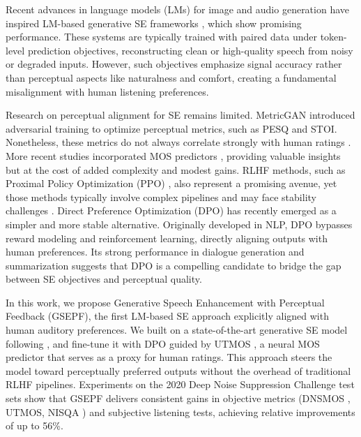 \documentclass{article}
\begin{document}
Recent advances in language models (LMs) for image and audio generation \cite{chang2023muse, wang2023neural} have inspired LM-based generative SE frameworks \cite{wang2024selm, yang2024genhancer, li2024masksr, yao2025gense, kang2025llase}, which show promising performance. These systems are typically trained with paired data under token-level prediction objectives, reconstructing clean or high-quality speech from noisy or degraded inputs. However, such objectives emphasize signal accuracy rather than perceptual aspects like naturalness and comfort, creating a fundamental misalignment with human listening preferences. 

Research on perceptual alignment for SE remains limited. MetricGAN \cite{fu2019metricGAN} introduced adversarial training to optimize perceptual metrics, such as PESQ and STOI. Nonetheless, these metrics do not always correlate strongly with human ratings \cite{santos2014improved, kumar2025using}. More recent studies incorporated MOS predictors \cite{nayem2023attention, kumar2025using}, providing valuable insights but at the cost of added complexity and modest gains. RLHF methods, such as Proximal Policy Optimization (PPO) \cite{schulman2017proximal}, also represent a promising avenue, yet those methods typically involve complex pipelines and may face stability challenges \cite{ouyang2022training}. Direct Preference Optimization (DPO) \cite{rafailov2023direct} has recently emerged as a simpler and more stable alternative. Originally developed in NLP, DPO bypasses reward modeling and reinforcement learning, directly aligning outputs with human preferences. Its strong performance in dialogue generation and summarization suggests that DPO is a compelling candidate to bridge the gap between SE objectives and perceptual quality.  

In this work, we propose Generative Speech Enhancement with Perceptual Feedback (GSEPF), the first LM-based SE approach explicitly aligned with human auditory preferences. We built on a state-of-the-art generative SE model following \cite{yao2025gense}, and fine-tune it with DPO guided by UTMOS \cite{saeki2022utmos}, a neural MOS predictor that serves as a proxy for human ratings. This approach steers the model toward perceptually preferred outputs without the overhead of traditional RLHF pipelines. Experiments on the 2020 Deep Noise Suppression Challenge test sets \cite{reddy2020interspeech} show that GSEPF delivers consistent gains in objective metrics (DNSMOS \cite{reddy2021dnsmos}, UTMOS, NISQA \cite{mittag2021nisqa}) and subjective listening tests, achieving relative improvements of up to 56\%.  
\end{document}
